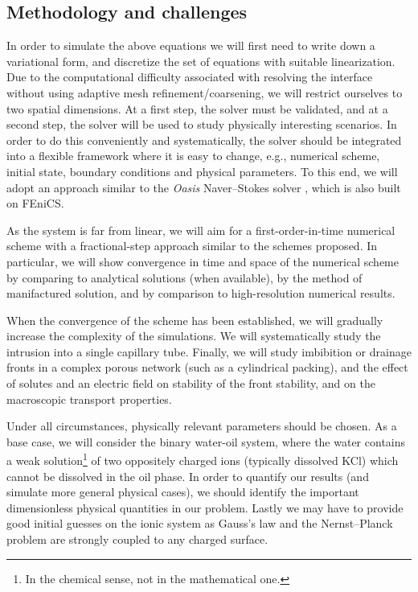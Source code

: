 \documentclass[a4paper,10pt]{article}
\begin{document}
\subsection*{Methodology and challenges}
In order to simulate the above equations we will first need to write down a variational form, and discretize the set of equations with suitable linearization.
Due to the computational difficulty associated with resolving the interface without using adaptive mesh refinement/coarsening, we will restrict ourselves to two spatial dimensions.
At a first step, the solver must be validated, and at a second step, the solver will be used to study physically interesting scenarios.
In order to do this conveniently and systematically, the solver should be integrated into a flexible framework where it is easy to change, e.g., numerical scheme, initial state, boundary conditions and physical parameters.
To this end, we will adopt an approach similar to the \emph{Oasis} Naver--Stokes solver \cite{mortensen2015}, which is also built on FEniCS.

As the system is far from linear, we will aim for a first-order-in-time numerical scheme with a fractional-step approach similar to the schemes proposed.
In particular, we will show convergence in time and space of the numerical scheme by comparing to analytical solutions (when available), by the method of manifactured solution, and by comparison to high-resolution numerical results.

When the convergence of the scheme has been established, we will gradually increase the complexity of the simulations.
We will systematically study the intrusion into a single capillary tube.
Finally, we will study imbibition or drainage fronts in a complex porous network (such as a cylindrical packing), and the effect of solutes and an electric field on stability of the front stability, and on the macroscopic transport properties.

Under all circumstances, physically relevant parameters should be chosen.
As a base case, we will consider the binary water-oil system, where the water contains a weak solution\footnote{In the chemical sense, not in the mathematical one.} of two oppositely charged ions (typically dissolved KCl) which cannot be dissolved in the oil phase.
In order to quantify our results (and simulate more general physical cases), we should identify the important dimensionless physical quantities in our problem.
Lastly we may have to provide good initial guesses on the ionic system as Gauss's law and the Nernst--Planck problem are strongly coupled to any charged surface\cite{mitscha-baude2017}.
\end{document}
